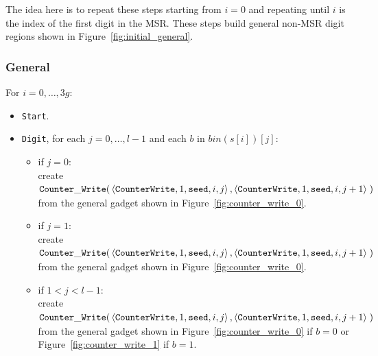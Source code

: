 The idea here is to repeat these steps starting from $i = 0$ and repeating until $i$ is the index of the first digit in the MSR. These
steps build general non-MSR digit regions shown in Figure~\ref{fig:initial_general}.


\subsubsection{General}
For $i = 0,\dots,3g$:
\begin{itemize}
    \item {\tt Start}.

    \item {\tt Digit}, for each $j=0,\ldots,l-1$ and each $b$ in $bin(s[i])[j]$:
    \begin{itemize}
        \item if $j = 0$:\\ create
        $\begin{aligned}[t]
            {\tt Counter\_Write}(&\left\langle {\tt CounterWrite}, 1, {\tt seed}, i, j \right\rangle, \left\langle {\tt CounterWrite}, 1, {\tt seed}, i, j + 1 \right\rangle \;)
        \end{aligned}$\\from the general gadget shown in Figure~\ref{fig:counter_write_0}.

        \item if $j = 1$:\\ create
        $\begin{aligned}[t]
            {\tt Counter\_Write}(&\left\langle {\tt CounterWrite}, 1, {\tt seed}, i, j \right\rangle, \left\langle {\tt CounterWrite}, 1, {\tt seed}, i, j + 1 \right\rangle \;)
        \end{aligned}$\\from the general gadget shown in Figure~\ref{fig:counter_write_0}.

        \item if $1 < j < l-1$:\\ create
        $\begin{aligned}[t]
            {\tt Counter\_Write}(&\left\langle {\tt CounterWrite}, 1, {\tt seed}, i, j \right\rangle, \left\langle {\tt CounterWrite}, 1, {\tt seed}, i, j + 1 \right\rangle \;)
        \end{aligned}$\\from the general gadget shown in Figure~\ref{fig:counter_write_0} if $b = 0$ or Figure~\ref{fig:counter_write_1} if $b = 1$.


\end{itemize}
\end{itemize}
